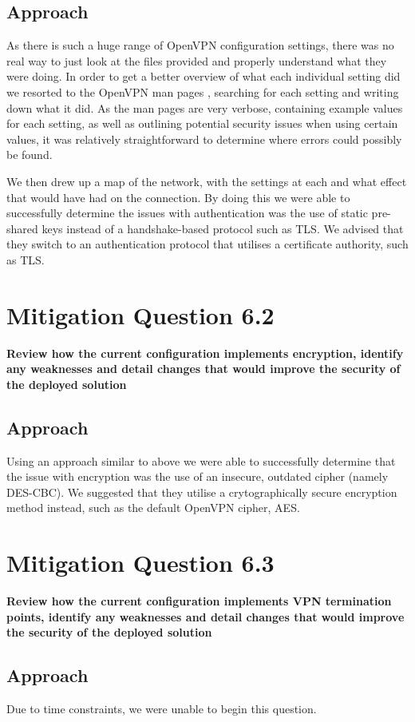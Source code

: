\subsection{Approach}
As there is such a huge range of OpenVPN configuration settings, there was no
real way to just look at the files provided and properly understand what they
were doing. In order to get a better overview of what each individual setting
did we resorted to the OpenVPN man pages \cite{OpenVPNMan}, searching for each
setting and writing down what it did. As the man pages are very verbose,
containing example values for each setting, as well as outlining potential
security issues when using certain values, it was relatively straightforward to
determine where errors could possibly be found.

We then drew up a map of the network, with the settings at each and what effect
that would have had on the connection. By doing this we were able to
successfully determine the issues with authentication was the use of static
pre-shared keys instead of a handshake-based protocol such as TLS. We advised
that they switch to an authentication protocol that utilises a certificate
authority, such as TLS.

\section{Mitigation Question 6.2}
\textbf{Review how the current configuration implements encryption, identify any
weaknesses and detail changes that would improve the security of the deployed
solution}
\subsection{Approach}
Using an approach similar to above we were able to successfully determine that
the issue with encryption was the use of an insecure, outdated cipher (namely
DES-CBC). We suggested that they utilise a crytographically secure encryption
method instead, such as the default OpenVPN cipher, AES.

\section{Mitigation Question 6.3}
\textbf{Review how the current configuration implements VPN termination points,
identify any weaknesses and detail changes that would improve the security of
the deployed solution}
\subsection{Approach}
Due to time constraints, we were unable to begin this question.

